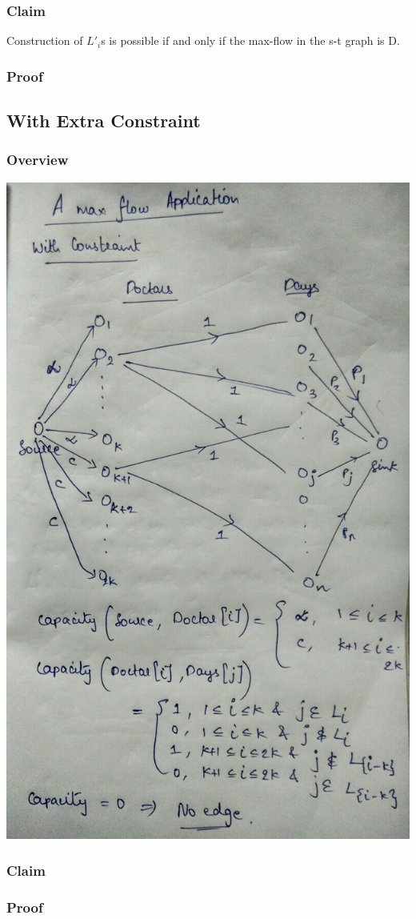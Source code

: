 \documentclass{article}
\begin{document}
\subsubsection{Claim}
Construction of $L'_i$s is possible if and only if the max-flow in the s-t graph is D.
\subsubsection{Proof}
\newpage
\subsection{With Extra Constraint}
\subsubsection{Overview}
\includegraphics[scale=0.5]{3b.jpg}
\subsubsection{Claim}
\subsubsection{Proof}
\end{document}
